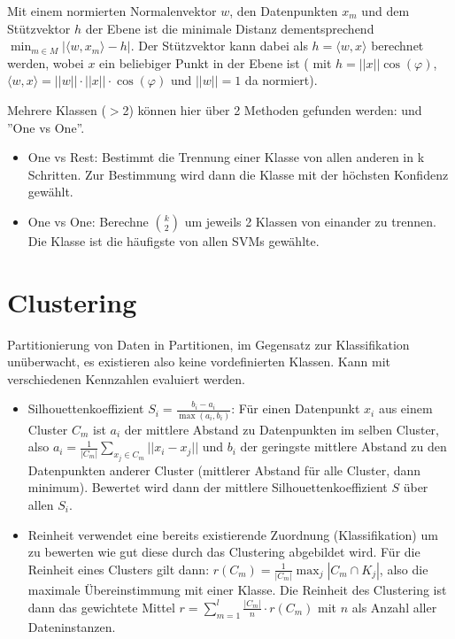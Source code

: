 \documentclass{article}
\begin{document}
Mit einem normierten Normalenvektor $w$, den Datenpunkten $x_{m}$ und dem Stützvektor $h$ der Ebene ist die minimale Distanz dementsprechend
$\min_{m \in M} |\langle w, x_{m} \rangle - h | $.
Der Stützvektor kann dabei als $ h=  \langle w,x \rangle $ berechnet werden, wobei $x$ ein beliebiger Punkt in der Ebene ist 
( mit $ h = ||x|| \cos(\varphi) $, $ {\langle w,x \rangle = ||w|| \cdot ||x|| \cdot \cos(\varphi)   }$  und $||w|| = 1$ da normiert).


Mehrere Klassen ($>$2) können hier über 2 Methoden gefunden werden:  und ''One vs One''. %
\begin{itemize}
    \item One vs Rest: Bestimmt die Trennung einer Klasse von allen anderen in k Schritten. Zur Bestimmung wird dann die Klasse mit der höchsten 
        Konfidenz gewählt.
    \item One vs One: Berechne $\binom{k}{2}$ um jeweils 2 Klassen von einander zu trennen. Die Klasse ist die häufigste von allen SVMs gewählte.
\end{itemize}

\section{Clustering}
Partitionierung von Daten in Partitionen, im Gegensatz zur Klassifikation unüberwacht, es existieren also keine vordefinierten Klassen.
Kann mit verschiedenen Kennzahlen evaluiert werden.
\begin{itemize}
    \item Silhouettenkoeffizient $S_{i} = \frac{b_{i} - a_{i}}{\max(a_{i}, b_{i})}$: 
        Für einen Datenpunkt $x_{i}$ aus einem Cluster $C_{m}$ ist $a_{i}$ der mittlere Abstand zu Datenpunkten im selben Cluster, also 
        $ a_{i} = \frac{1}{|C_{m}|}\sum_{x_{j} \in C_{m}} ||x_{i} - x_{j}|| $ 
        und $b_{i}$ der geringste mittlere Abstand zu den Datenpunkten anderer Cluster (mittlerer Abstand für alle Cluster, dann minimum). 
        Bewertet wird dann der mittlere Silhouettenkoeffizient $S$ über allen $S_{i}$.
    \item Reinheit verwendet eine bereits existierende Zuordnung (Klassifikation) um zu bewerten wie gut diese durch das Clustering abgebildet wird.
        Für die Reinheit eines Clusters gilt dann: $ r(C_{m}) = \frac{1}{|C_{m}|} \max_{j} |C_{m} \cap K_{j}|  $, also die maximale Übereinstimmung mit einer Klasse.
        Die Reinheit des Clustering ist dann das gewichtete Mittel $r = \sum_{m=1}^{l} \frac{|C_{m}|}{n} \cdot r(C_{m}) $ mit $n$ als Anzahl aller Dateninstanzen.
\end{itemize}
\end{document}
